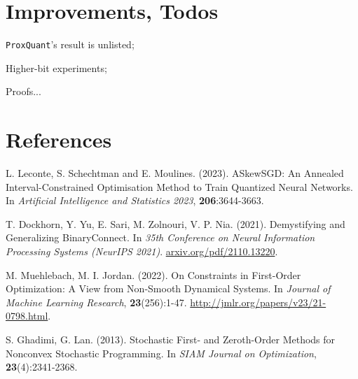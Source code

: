 \documentclass[10pt,a4paper]{article}
\begin{document}
\newpage
\section{Improvements, Todos}
\begin{enumerate}[label=\text{[}\arabic*\text{]}]
  \item \texttt{ProxQuant}'s result is unlisted;
  \item Higher-bit experiments;
  \item Proofs...
\end{enumerate}

\newpage
\section{References}
\begin{enumerate}[label=\text{[}\arabic*\text{]}]
  \item \label{1}L. Leconte, S. Schechtman and E. Moulines. (2023). ASkewSGD: An Annealed Interval-Constrained Optimisation Method to Train Quantized Neural Networks. In \textit{Artificial Intelligence and Statistics 2023}, \textbf{206}:3644-3663.
  \item \label{2}T. Dockhorn, Y. Yu, E. Sari, M. Zolnouri, V. P. Nia. (2021). Demystifying and Generalizing BinaryConnect. In \textit{35th Conference on Neural Information Processing Systems (NeurIPS 2021)}. \url{arxiv.org/pdf/2110.13220}.
  \item \label{3}M. Muehlebach, M. I. Jordan. (2022). On Constraints in First-Order Optimization: A View from Non-Smooth Dynamical Systems. In \textit{Journal of Machine Learning Research}, \textbf{23}(256):1-47. \url{http://jmlr.org/papers/v23/21-0798.html}.
  \item \label{4}S. Ghadimi, G. Lan. (2013). Stochastic First- and Zeroth-Order Methods for Nonconvex Stochastic Programming. In \textit{SIAM Journal on Optimization}, \textbf{23}(4):2341-2368.

\end{enumerate}
\end{document}
